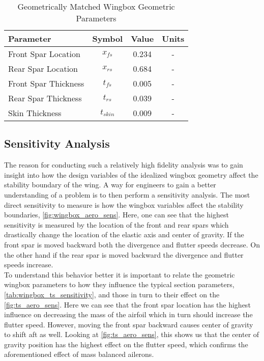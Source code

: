 \begin{table}[H]
    \centering
    \caption{Geometrically Matched Wingbox Geometric Parameters}
    \label{tab:geometric_wbox_values}
    \begin{tabularx}{\textwidth}{p{}CCC} %
    \toprule
    \textbf{Parameter} & \textbf{Symbol} & \textbf{Value} &\textbf{Units}\\
    \midrule
    Front Spar Location & $x_{fs}$ & 0.234 & \si{-} \\
    Rear Spar Location & $x_{rs}$ & 0.684 & \si{-} \\
    Front Spar Thickness & $t_{fs}$ & 0.005 & \si{-} \\
    Rear Spar Thickness & $t_{rs}$ & 0.039 & \si{-} \\
    Skin Thickness & $t_{skin}$ & 0.009 & \si{-} \\ \bottomrule
    \end{tabularx}
\end{table}

\subsection{Sensitivity Analysis}
The reason for conducting such a relatively high fidelity analysis was to gain
insight into how the design variables of the idealized wingbox geometry affect
the stability boundary of the wing. A way for engineers to gain a better
understanding of a problem is to then perform a sensitivity analysis. The most
direct sensitivity to measure is how the wingbox variables affect the
stability boundaries, \cref{fig:wingbox_aero_sens}. Here, one can see that the
highest sensitivity is measured by the location of the front and rear spars
which drastically change the location of the elastic axis and center of
gravity. If the front spar is moved backward both the divergence and flutter
speeds decrease. On the other hand if the rear spar is moved backward the
divergence and flutter speeds increase.\\

To understand this behavior better it is important to relate the geometric
wingbox parameters to how they influence the typical section parameters,
\cref{tab:wingbox_ts_sensitivity}, and those in turn to their effect on the
\cref{fig:ts_aero_sens}. Here we can see that the front spar location
has the highest influence on decreasing the mass of the airfoil which in turn
should increase the flutter speed. However, moving the front spar backward
causes center of gravity to shift aft as well. Looking at
\cref{fig:ts_aero_sens}, this shows us that the center of gravity position has
the highest effect on the flutter speed, which confirms the aforementioned
effect of mass balanced ailerons.


